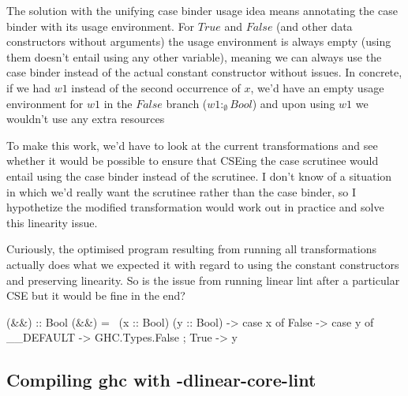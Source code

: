 \documentclass[a4paper, draft]{article}
\begin{document}
The solution with the unifying case binder usage idea means annotating the case
binder with its usage environment. For $True$ and $False$ (and other data
constructors without arguments) the usage environment is always empty (using
them doesn't entail using any other variable), meaning we can always use the
case binder instead of the actual constant constructor without issues.
%
In concrete, if we had $w1$ instead of the second occurrence of $x$, we'd have
an empty usage environment for $w1$ in the $False$ branch ($w1 :_\emptyset
Bool$) and upon using $w1$ we wouldn't use any extra resources


To make this work, we'd have to look at the current transformations and see
whether it would be possible to ensure that CSEing the case scrutinee would
entail using the case binder instead of the scrutinee. I don't know of a
situation in which we'd really want the scrutinee rather than the case binder,
so I hypothetize the modified transformation would work out in practice and
solve this linearity issue.



Curiously, the optimised program resulting from running all transformations
actually does what we expected it with regard to using the constant constructors
and preserving linearity. So is the issue from running linear lint after a
particular CSE but it would be fine in the end?
\begin{code}
(&&) :: Bool %
(&&) = \ (x :: Bool) (y :: Bool) ->
  case x of {
    False -> case y of { __DEFAULT -> GHC.Types.False };
    True -> y
  }
\end{code}

\subsection{Compiling ghc with -dlinear-core-lint}
\end{document}
